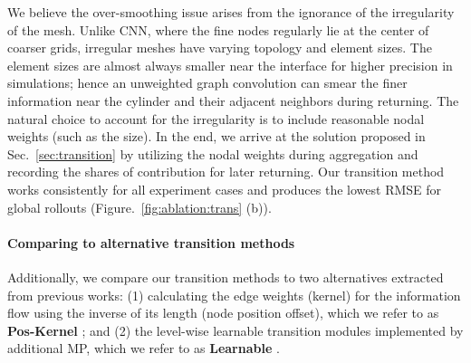 We believe the over-smoothing issue arises from the ignorance of the irregularity of the mesh. Unlike CNN, where the fine nodes regularly lie at the center of coarser grids, irregular meshes have varying topology and element sizes. The element sizes are almost always smaller near the interface for higher precision in simulations; hence an unweighted graph convolution can smear the finer information near the cylinder and their adjacent neighbors during returning. The natural choice to account for the irregularity is to include reasonable nodal weights (such as the size). In the end, we arrive at the solution proposed in Sec.~\ref{sec:transition} by utilizing the nodal weights during aggregation and recording the shares of contribution for later returning. Our transition method works consistently for all experiment cases and produces the lowest RMSE for global rollouts (Figure.~\ref{fig:ablation:trans} (b)).

\paragraph*{Comparing to alternative transition methods} Additionally, we compare our transition methods to two alternatives extracted from previous works: (1) calculating the edge weights (kernel) for the information flow using the inverse of its length (node position offset), which we refer to as \textbf{Pos-Kernel} \cite{liu2021multi}; and (2) the level-wise learnable transition modules implemented by additional MP, which we refer to as \textbf{Learnable} \cite{fortunato2022multiscale}.

